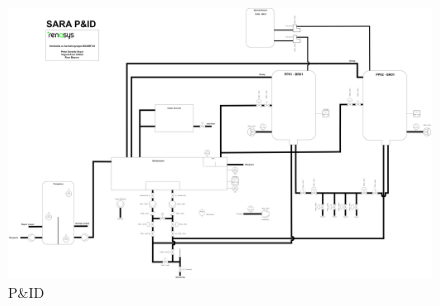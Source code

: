 \begin{figure}[htbp]
    \centering
    \includegraphics[angle=90,width=1\textwidth]{Figurar/P&ID.drawio.png}
    \caption{P\&ID}\label{fig:HMI}
\end{figure}